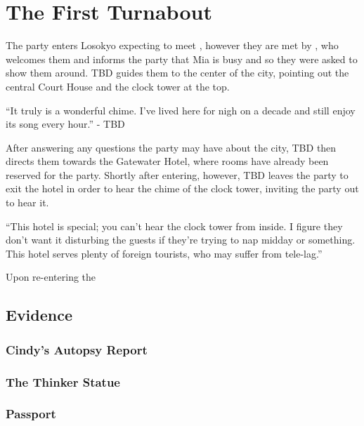 \section{The First Turnabout}
The party enters Losokyo expecting to meet , however they are met by , who welcomes them and informs the party that Mia is busy and so they were asked to show them around. TBD guides them to the center of the city, pointing out the central Court House and the clock tower at the top. 
\begin{center}
``It truly is a wonderful chime. I've lived here for nigh on a decade and still enjoy its song every hour.''
- TBD \end{center}

After answering any questions the party may have about the city, TBD then directs them towards the Gatewater Hotel, where rooms have already been reserved for the party. Shortly after entering, however, TBD leaves the party to exit the hotel in order to hear the chime of the clock tower, inviting the party out to hear it.
\begin{center}
``This hotel is special; you can't hear the clock tower from inside. I figure they don't want it disturbing the guests if they're trying to nap midday or something. This hotel serves plenty of foreign tourists, who may suffer from tele-lag.''
\end{center}

Upon re-entering the 



\subsection{Evidence}
\subsubsection{Cindy's Autopsy Report}

\subsubsection{The Thinker Statue}

\subsubsection{Passport}